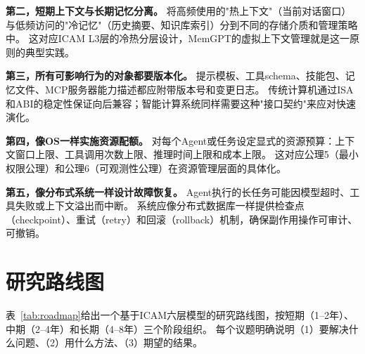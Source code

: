 \textbf{第二，短期上下文与长期记忆分离。}
将高频使用的"热上下文"（当前对话窗口）与低频访问的"冷记忆"（历史摘要、知识库索引）分到不同的存储介质和管理策略中。
这对应ICAM L3层的冷热分层设计，MemGPT的虚拟上下文管理就是这一原则的典型实践\cite{memgpt2023}。

\textbf{第三，所有可影响行为的对象都要版本化。}
提示模板、工具schema、技能包、记忆文件、MCP服务器能力描述都应附带版本号和变更日志\cite{mcp_intro_2026,agentprotocols2025}。
传统计算机通过ISA和ABI的稳定性保证向后兼容；智能计算系统同样需要这种"接口契约"来应对快速演化。

\textbf{第四，像OS一样实施资源配额。}
对每个Agent或任务设定显式的资源预算：上下文窗口上限、工具调用次数上限、推理时间上限和成本上限\cite{linux_cgroup_2026}。
这对应公理5（最小权限公理）和公理6（可观测性公理）在资源管理层面的具体化。

\textbf{第五，像分布式系统一样设计故障恢复。}
Agent执行的长任务可能因模型超时、工具失败或上下文溢出而中断。
系统应像分布式数据库一样提供检查点（checkpoint）、重试（retry）和回滚（rollback）机制，确保副作用操作可审计、可撤销\cite{raft2014,spanner2012}。

\section{研究路线图}
\label{sec:roadmap}

表~\ref{tab:roadmap}给出一个基于ICAM六层模型的研究路线图，按短期（1--2年）、中期（2--4年）和长期（4--8年）三个阶段组织。
每个议题明确说明（1）要解决什么问题、（2）用什么方法、（3）期望的结果。

